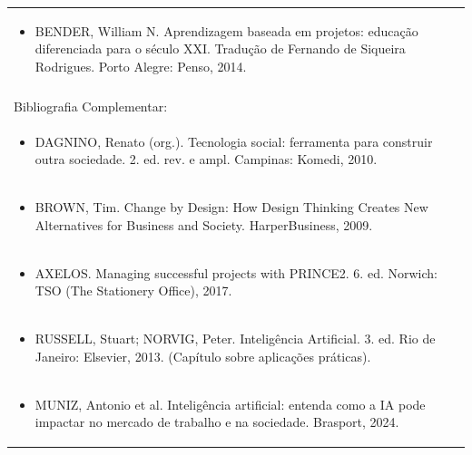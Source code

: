 \documentclass[11pt]{article}
\begin{document}
\begin{center}
\begin{longtable}{|p{4cm}|p{4cm}|p{4cm}|p{4cm}|}
\multicolumn{4}{|p{\dimexpr 16cm + 6\tabcolsep\relax}|}{\begin{itemize}\item BENDER, William N. Aprendizagem baseada em projetos: educação diferenciada para o século XXI. Tradução de Fernando de Siqueira Rodrigues. Porto Alegre: Penso, 2014.\end{itemize}}\\
\multicolumn{4}{|p{16cm}|}{}\\
\hline
\multicolumn{4}{|p{16cm}|}{Bibliografia Complementar:}\\*
\multicolumn{4}{|p{\dimexpr 16cm + 6\tabcolsep\relax}|}{\begin{itemize}\item DAGNINO, Renato (org.). Tecnologia social: ferramenta para construir outra sociedade. 2. ed. rev. e ampl. Campinas: Komedi, 2010.\end{itemize}}\\
\multicolumn{4}{|p{\dimexpr 16cm + 6\tabcolsep\relax}|}{\begin{itemize}\item BROWN, Tim. Change by Design: How Design Thinking Creates New Alternatives for Business and Society. HarperBusiness, 2009.\end{itemize}}\\
\multicolumn{4}{|p{\dimexpr 16cm + 6\tabcolsep\relax}|}{\begin{itemize}\item AXELOS. Managing successful projects with PRINCE2. 6. ed. Norwich: TSO (The Stationery Office), 2017.\end{itemize}}\\
\multicolumn{4}{|p{\dimexpr 16cm + 6\tabcolsep\relax}|}{\begin{itemize}\item RUSSELL, Stuart; NORVIG, Peter. Inteligência Artificial. 3. ed. Rio de Janeiro: Elsevier, 2013. (Capítulo sobre aplicações práticas).\end{itemize}}\\
\multicolumn{4}{|p{\dimexpr 16cm + 6\tabcolsep\relax}|}{\begin{itemize}\item MUNIZ, Antonio et al. Inteligência artificial: entenda como a IA pode impactar no mercado de trabalho e na sociedade. Brasport, 2024.\end{itemize}}\\
\hline
\end{longtable}
\end{center}
\end{document}

